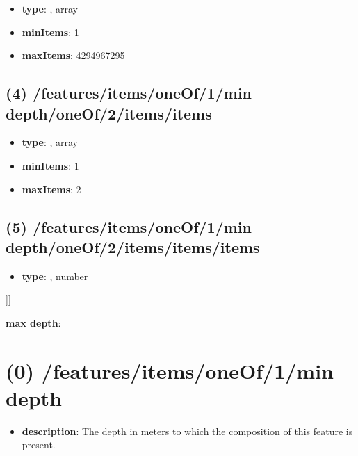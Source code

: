 \begin{itemize}[leftmargin=3em]\item {\bf type}: , array\item {\bf minItems}: 1
\item {\bf maxItems}: 4294967295
\end{itemize}\subsection{(4) /features/items/oneOf/1/min depth/oneOf/2/items/items}
\begin{itemize}[leftmargin=4em]\item {\bf type}: , array\item {\bf minItems}: 1
\item {\bf maxItems}: 2
\end{itemize}\subsection{(5) /features/items/oneOf/1/min depth/oneOf/2/items/items/items}
\begin{itemize}[leftmargin=5em]\item {\bf type}: , number\end{itemize}]]\item {\bf max depth}: \section{(0) /features/items/oneOf/1/min depth}
\begin{itemize}[leftmargin=0em]\item {\bf description}: The depth in meters to which the composition of this feature is present.
\end{itemize}
